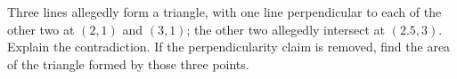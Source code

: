 Three lines allegedly form a triangle, with one line perpendicular to each of the other two at $(2,1)$ and $(3,1)$; the other two allegedly intersect at $(2.5,3)$. Explain the contradiction. If the perpendicularity claim is removed, find the area of the triangle formed by those three points.
